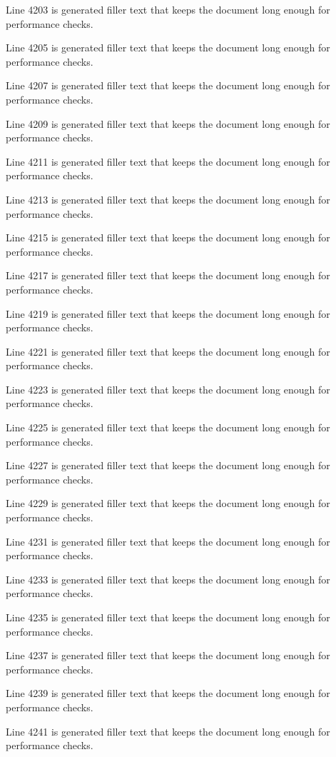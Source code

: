 Line 4203 is generated filler text that keeps the document long enough for performance checks.

Line 4205 is generated filler text that keeps the document long enough for performance checks.

Line 4207 is generated filler text that keeps the document long enough for performance checks.

Line 4209 is generated filler text that keeps the document long enough for performance checks.

Line 4211 is generated filler text that keeps the document long enough for performance checks.

Line 4213 is generated filler text that keeps the document long enough for performance checks.

Line 4215 is generated filler text that keeps the document long enough for performance checks.

Line 4217 is generated filler text that keeps the document long enough for performance checks.

Line 4219 is generated filler text that keeps the document long enough for performance checks.

Line 4221 is generated filler text that keeps the document long enough for performance checks.

Line 4223 is generated filler text that keeps the document long enough for performance checks.

Line 4225 is generated filler text that keeps the document long enough for performance checks.

Line 4227 is generated filler text that keeps the document long enough for performance checks.

Line 4229 is generated filler text that keeps the document long enough for performance checks.

Line 4231 is generated filler text that keeps the document long enough for performance checks.

Line 4233 is generated filler text that keeps the document long enough for performance checks.

Line 4235 is generated filler text that keeps the document long enough for performance checks.

Line 4237 is generated filler text that keeps the document long enough for performance checks.

Line 4239 is generated filler text that keeps the document long enough for performance checks.

Line 4241 is generated filler text that keeps the document long enough for performance checks.

